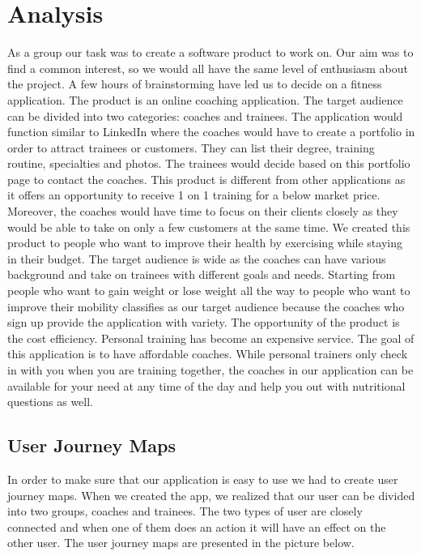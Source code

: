 \section{Analysis}

As a group our task was to create a software product to work on. Our aim was to find a common interest, so we would all have the same level of enthusiasm about the project. A few hours of brainstorming have led us to decide on a fitness application. 
The product is an online coaching application. The target audience can be divided into two categories: coaches and trainees. The application would function similar to LinkedIn where the coaches would have to create a portfolio in order to attract trainees or customers. They can list their degree, training routine, specialties and photos. The trainees would decide based on this portfolio page to contact the coaches.
This product is different from other applications as it offers an opportunity to receive 1 on 1 training for a below market price. Moreover, the coaches would have time to focus on their clients closely as they would be able to take on only a few customers at the same time.
We created this product to people who want to improve their health by exercising while staying in their budget. The target audience is wide as the coaches can have various background and take on trainees with different goals and needs. Starting from people who want to gain weight or lose weight all the way to people who want to improve their mobility classifies as our target audience because the coaches who sign up provide the application with variety.
The opportunity of the product is the cost efficiency. Personal training has become an expensive service. The goal of this application is to have affordable coaches. While personal trainers only check in with you when you are training together, the coaches in our application can be available for your need at any time of the day and help you out with nutritional questions as well.

\subsection{User Journey Maps}
\label{sec:UserJourneyMaps}
In order to make sure that our application is easy to use we had to create user journey maps. When we created the app, we realized that our user can be divided into two groups, coaches and trainees. The two types of user are closely connected and when one of them does an action it will have an effect on the other user. The user journey maps are presented in the picture below.

